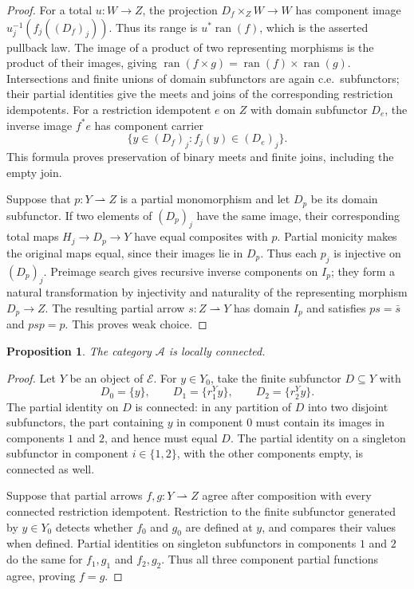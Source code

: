 \documentclass[11pt]{article}
\newtheorem{proposition}[theorem]{Proposition}
\newcommand{\ran}{\operatorname{ran}}
\begin{document}
\begin{proof}
For a total $u:W\to Z$, the projection
$D_f\times_Z W\to W$ has component image
$u_j^{-1}(f_j((D_f)_j))$. Thus its range is $u^*\ran(f)$,
which is the asserted pullback law. The image of a product
of two representing morphisms is the product of their images, giving
$\ran(f\times g)=\ran(f)\times\ran(g)$.
Intersections and finite unions of domain subfunctors are again
c.e.\ subfunctors; their partial identities give the meets and joins
of the corresponding restriction idempotents. For a restriction idempotent
$e$ on $Z$ with domain subfunctor $D_e$, the inverse image $f^*e$
has component carrier
\[
 \{y\in(D_f)_j:f_j(y)\in(D_e)_j\}.
\]
This formula proves preservation of binary meets and finite joins,
including the empty join.

Suppose that $p:Y\rightharpoonup Z$ is a partial monomorphism
and let $D_p$ be its domain subfunctor. If two elements of $(D_p)_j$
have the same image, their corresponding total maps
$H_j\to D_p\to Y$ have equal composites with $p$.
Partial monicity makes the original maps equal, since their
images lie in $D_p$. Thus each $p_j$ is injective on $(D_p)_j$.
Preimage search gives recursive inverse components on $I_p$;
they form a natural transformation by injectivity and naturality of
the representing morphism $D_p\to Z$.
The resulting partial arrow $s:Z\rightharpoonup Y$ has domain
$I_p$ and satisfies $ps=\bar s$ and $psp=p$.
This proves weak choice.
\end{proof}

\begin{proposition}\label{prop:fork-local}
The category $\mathcal A$ is locally connected.
\end{proposition}
\begin{proof}
Let $Y$ be an object of $\mathcal E$. For $y\in Y_0$, take the
finite subfunctor $D\subseteq Y$ with
\[
 D_0=\{y\},\qquad D_1=\{r_1^Yy\},\qquad D_2=\{r_2^Yy\}.
\]
The partial identity on $D$ is connected: in any partition of $D$
into two disjoint subfunctors, the part containing $y$ in component
$0$ must contain its images in components $1$ and $2$, and hence
must equal $D$. The partial identity on a singleton subfunctor
in component $i\in\{1,2\}$, with the other components empty,
is connected as well.

Suppose that partial arrows $f,g:Y\rightharpoonup Z$ agree
after composition with every connected restriction idempotent.
Restriction to the
finite subfunctor generated by $y\in Y_0$ detects whether
$f_0$ and $g_0$ are defined at $y$, and compares their values
when defined. Partial identities on singleton subfunctors in
components $1$ and $2$ do the same for $f_1,g_1$ and $f_2,g_2$.
Thus all three component partial functions agree, proving $f=g$.
\end{proof}
\end{document}
